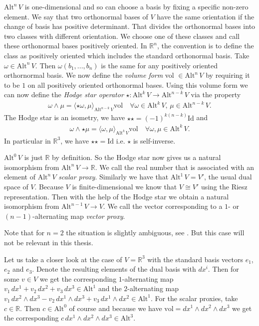\documentclass[12pt,a4paper]{article}
\numberwithin{equation}{subsection}
\numberwithin{lemma}{subsection}
\theoremstyle{definition}
\newcommand{\alternating}[2]{ {\text{Alt}^{#1}\,#2} }
\newcommand{\real}{\mathbb{R}}
\begin{document}
$\alternating{n}{V}$ is one-dimensional and so can choose a basis by fixing 
a specific non-zero element.
We say that two orthonormal bases of $V$ 
have the same orientation if the change of basis has positive determinant. 
That divides the orthonormal bases into two classes with different orientation.
We choose one of these classes and call these orthonormal bases positively
oriented. In $\real^n$, the convention is to define the class as 
positively oriented which includes the standard orthonormal basis.
Take $\omega \in \alternating{n}{V}$. Then 
$\omega(b_1,...,b_n)$ is the same for any positively oriented orthornormal
basis. We now define the 
\textit{volume form} vol $\in \alternating{n}{V}$ by requiring
it to be $1$ on all positively oriented orthonormal bases. Using this volume 
form we can now define the \textit{Hodge star operator} 
$\star: \alternating{k}{V} \rightarrow \alternating{n-k}{V}$ via the property 
\begin{align*}
    \omega \wedge \mu = \langle \star\omega, \mu \rangle_{\alternating{n-k}{V}} 
    \text{vol}
    \quad \forall \omega \in \alternating{k}{V} , \, 
    \mu \in \alternating{n-k}{V}.
\end{align*}
The Hodge star is an isometry, we have $\star\star = (-1)^{k(n-k)}\text{Id}$ and 
\begin{align*}
    \omega \wedge \star\mu = \langle \omega, \mu \rangle_{\alternating{k}{V}} 
    \text{vol} \quad \forall \omega, \mu \in \alternating{k}{V}.
\end{align*}
In particular in $\real^3$, we have 
$\star\star = \text{Id}$ i.e. $\star$ is self-inverse.


$\alternating{0}{V}$ is just $\real$ by definition. So the Hodge star 
now gives us a natural isomorphism from $\alternating{n}{V} \rightarrow \real$.
We call the real number that is associated with an element of 
$\alternating{n}{V}$ \textit{scalar proxy}. Similarly we have that 
$\alternating{1}{V} = V'$, the usual dual space of $V$. Because $V$ is 
finite-dimensional we know that $V \cong V'$ using the Riesz representation.
Then with the help of the Hodge star we obtain a natural isomorphism 
from $\alternating{n-1}{V} \rightarrow V$. We call the vector corresponding
to a $1$- or $(n-1)$-alternating map \textit{vector proxy}. 

Note that for $n=2$ the situation 
is slightly ambiguous, see \cite[p.67]{arnold}. But this case will not be
relevant in this thesis.


Let us take a closer look at the case of $V= \real^3$ with the standard basis
vectors $e_1$, $e_2$ and $e_3$. Denote the resulting elements 
of the dual basis with $dx^i$. Then for some $v\in V$ we get the 
corresponding $1$-alternating map $v_1 \, dx^1 + v_2 \, dx^2 + v_3 \, dx^3 \in 
\text{Alt}^1$ and the $2$-alternating map
$v_1\, dx^2 \wedge dx^3 - v_2 \,dx^1 \wedge dx^3 + v_3 \,dx^1 \wedge dx^2 \in 
\text{Alt}^1$. For the scalar proxies, take $c \in \real$. Then 
$c \in \text{Alt}^0$ of course and because 
we have $\text{vol} = dx^1\wedge dx^2\wedge dx^3$ we get the corresponding 
$c \, dx^1\wedge dx^2\wedge dx^3 \in \text{Alt}^3$.
\end{document}
